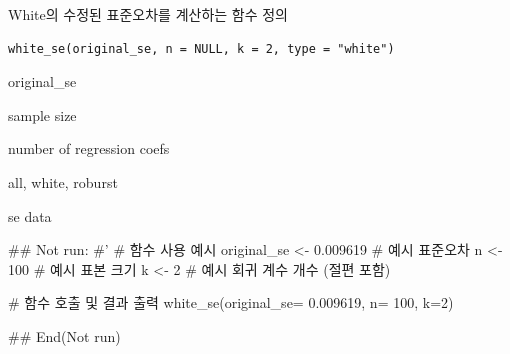 \documentclass[a4paper]{book}
\begin{document}
%
\begin{Description}
White의 수정된 표준오차를 계산하는 함수 정의
\end{Description}
%
\begin{Usage}
\begin{verbatim}
white_se(original_se, n = NULL, k = 2, type = "white")
\end{verbatim}
\end{Usage}
%
\begin{Arguments}
\begin{ldescription}
\item[\code{original\_se}] original\_se

\item[\code{n}] sample size

\item[\code{k}] number of regression coefs

\item[\code{type}] all, white, roburst
\end{ldescription}
\end{Arguments}
%
\begin{Value}
se data
\end{Value}
%
\begin{Examples}
\begin{ExampleCode}
\#\# Not run: 
#'
# 함수 사용 예시
original_se <- 0.009619  # 예시 표준오차
n <- 100  # 예시 표본 크기
k <- 2  # 예시 회귀 계수 개수 (절편 포함)

# 함수 호출 및 결과 출력
white_se(original_se= 0.009619, n= 100, k=2)

## End(Not run)

\end{ExampleCode}
\end{Examples}
\end{document}
